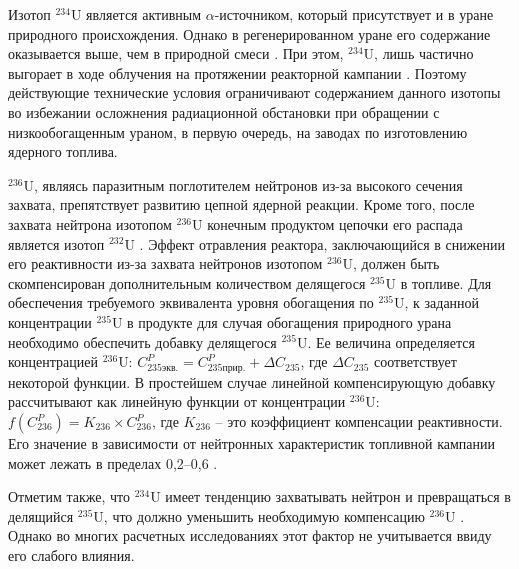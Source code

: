 Изотоп $^{234}$U является активным $\alpha$-источником, который присутствует и в уране природного происхождения. Однако в регенерированном уране его содержание оказывается выше, чем в природной смеси \cite{matveevUran232EgoVliyanie1985}. При этом, $^{234}$U, лишь частично выгорает в ходе облучения на протяжении реакторной кампании \cite{gresleyEnrichingRecyclingUranium1988}. Поэтому действующие технические условия ограничивают содержанием данного изотопы во избежании осложнения радиационной обстановки при обращении с низкообогащенным ураном, в первую очередь, на заводах по изготовлению ядерного топлива.

$^{236}$U, являясь паразитным поглотителем нейтронов из-за высокого сечения захвата, препятствует развитию цепной ядерной реакции. Кроме того, после захвата нейтрона изотопом  $^{236}$U конечным продуктом цепочки его распада является изотоп  $^{232}$U \cite{ksenofontovIssledovanieProblemyVovlecheniya1988}.
Эффект отравления реактора, заключающийся в снижении его реактивности из-за захвата нейтронов изотопом  $^{236}$U, должен быть скомпенсирован дополнительным количеством делящегося $^{235}$U в топливе. Для обеспечения требуемого эквивалента уровня обогащения по $^{235}$U, к заданной концентрации $^{235}$U в продукте для случая обогащения природного урана необходимо обеспечить добавку делящегося $^{235}$U.
Ее величина определяется концентрацией $^{236}$U:
$C_{235 экв.}^{P}=C_{235 прир.}^{P}+\Delta C_{235}$, где $\Delta C_{235}$ соответствует некоторой функции. В простейшем случае линейной компенсирующую добавку рассчитывают как линейную функции от концентрации $^{236}$U: $f(C_{236}^{P})=K_{236} \times C_{236}^{P}$, где $K_{236}$ -- это коэффициент компенсации реактивности. Его значение в зависимости от нейтронных характеристик топливной кампании может лежать в пределах 0,2--0,6 \cite{delagarzaMulticomponentIsotopeSeparation1961, delculAnalysisReuseUranium2009}. 

Отметим также, что $^{234}$U имеет тенденцию захватывать нейтрон и превращаться в делящийся $^{235}$U, что должно уменьшить необходимую компенсацию $^{236}$U \cite{dyachenkoIspolzovanieRegenerirovannogoUrana2012}. Однако во многих расчетных исследованиях этот фактор не учитывается ввиду его слабого влияния.


